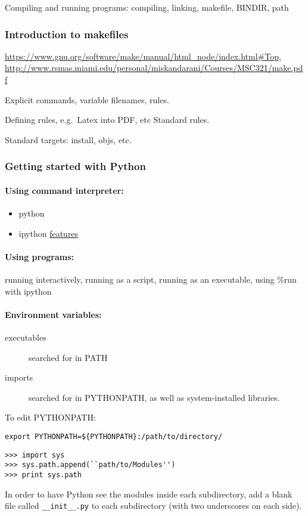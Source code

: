 \documentclass{article}
\begin{document}
Compiling and running programs: compiling, linking, makefile, BINDIR, path
\subsubsection{Introduction to makefiles}
\url{https://www.gnu.org/software/make/manual/html_node/index.html#Top},
\url{http://www.rsmas.miami.edu/personal/miskandarani/Courses/MSC321/make.pdf}

Explicit commands, variable filenames, rules.

Defining rules, e.g.\ Latex into PDF, etc Standard rules.

Standard targets: install, objs, etc.
\subsubsection{Getting started with Python}
\paragraph{Using command interpreter:}
\begin{itemize}
    \item python
    \item ipython \href{http://ipython.org/ipython-doc/2/interactive/}
        {features}
\end{itemize}

\paragraph{Using programs:}
running interactively, running as a script, running as
an executable, using \%run with ipython

\paragraph{Environment variables:}
\begin{description}
    \item [executables] searched for in PATH
    \item [imports] searched for in PYTHONPATH,
        as well as system-installed libraries.
\end{description}
To edit PYTHONPATH:
\begin{verbatim}
export PYTHONPATH=${PYTHONPATH}:/path/to/directory/
\end{verbatim}
\begin{verbatim}
>>> import sys
>>> sys.path.append(``path/to/Modules'')
>>> print sys.path
\end{verbatim}
In order to have Python see the modules inside each subdirectory,
add a blank file called \verb|__init__.py| to each subdirectory
(with two underscores on each side).
\end{document}
